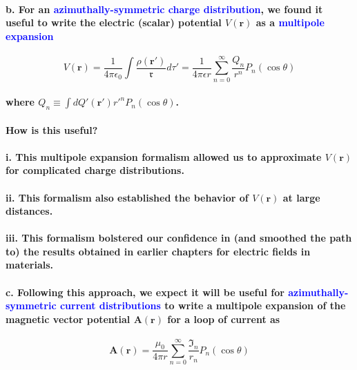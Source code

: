 \documentclass{article}
\begin{document}
\paragraph{\indent b. For an \textcolor{blue}{azimuthally-symmetric charge distribution}, we found it useful to write the electric (scalar) potential $V(\boldsymbol{r})$ as a \textcolor{blue}{multipole expansion}}
\begin{equation*}
    V(\boldsymbol{r})=\frac{1}{4\pi\epsilon_0}\int\frac{\rho(\boldsymbol{r}')}{\mathfrak{r}}d\tau'=\frac{1}{4\pi\epsilon r}\sum_{n=0}^{\infty}\frac{Q_n}{r^n}P_n(\cos\theta)
\end{equation*}
\paragraph{where $Q_n\equiv\int dQ'(\boldsymbol{r}')r'^nP_n(\cos\theta)$.}
\paragraph{How is this useful?}
\paragraph{\indent i. This multipole expansion formalism allowed us to approximate $V(\boldsymbol{r})$ for complicated charge distributions.}
\paragraph{\indent ii. This formalism also established the behavior of $V(\boldsymbol{r})$ at large distances.}
\paragraph{\indent iii. This formalism bolstered our confidence in (and smoothed the path to) the results obtained in earlier chapters for electric fields in materials.}
\paragraph{\indent c. Following this approach, we expect it will be useful for \textcolor{blue}{azimuthally-symmetric current distributions} to write a multipole expansion of the magnetic vector potential $\boldsymbol{A}(\boldsymbol{r})$ for a loop of current as }
\begin{equation*}
    \boldsymbol{A}(\boldsymbol{r})=\frac{\mu_0}{4\pi r}\sum_{n=0}^{\infty}\frac{\mathfrak{I}_n}{r_n}P_n(\cos\theta)
\end{equation*}
\end{document}
